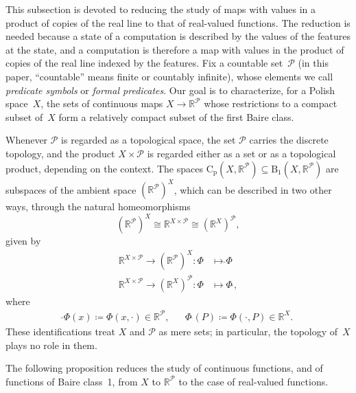 \documentclass[psamsfonts]{amsart}
\theoremstyle{definition}
\theoremstyle{remark}
\newcommand{\Cp}{\mathrm{C}_{\mathrm{p}}}
\numberwithin{equation}{section}
\begin{document}
This subsection is devoted to reducing the study of maps with values in a product of copies of the real line to that of real-valued functions.
The reduction is needed because a state of a computation is described by the values of the features at the state, and a computation is therefore a map with values in the product of copies of the real line indexed by the features.
Fix a countable set~$\mathcal{P}$ (in this paper, “countable” means finite or countably infinite), whose elements we call \emph{predicate symbols} or \emph{formal predicates}.
Our goal is to characterize, for a Polish space~$X$, the sets of continuous maps $X\to\mathbb{R}^{\mathcal{P}}$ whose restrictions to a compact subset of~$X$ form a relatively compact subset of the first Baire class.

Whenever $\mathcal{P}$ is regarded as a topological space, the set $\mathcal{P}$ carries the discrete topology, and the product $X\times \mathcal{P}$ is regarded either as a set or as a topological product, depending on the context.
The spaces $\Cp(X, \mathbb{R}^{\mathcal{P}})\subseteq \mathrm{B}_1(X, \mathbb{R}^{\mathcal{P}})$ are subspaces of the ambient space $(\mathbb{R}^{\mathcal{P}})^X$, which can be described in two other ways, through the natural homeomorphisms
\begin{equation*}
(\mathbb{R}^{\mathcal{P}})^X \cong \mathbb{R}^{X\times \mathcal{P}} \cong (\mathbb{R}^X)^{\mathcal{P}},
\end{equation*}
given by
\begin{align*}
\mathbb{R}^{X\times \mathcal{P}} \to (\mathbb{R}^{\mathcal{P}})^X: \Phi & \mapsto {\hat{}}\Phi    \\
\mathbb{R}^{X\times \mathcal{P}} \to (\mathbb{R}^X)^{\mathcal{P}}: \Phi & \mapsto \Phi{\,\hat{}},
\end{align*}
where
\begin{align*}
\hat{}\Phi(x)\coloneqq \Phi(x, \cdot)\in \mathbb{R}^{\mathcal{P}}, &  &
\Phi\,\hat{}(P)\coloneqq \Phi(\cdot, P) \in \mathbb{R}^X.
\end{align*}
These identifications treat $X$ and $\mathcal{P}$ as mere sets;
in particular, the topology of~$X$ plays no role in them.

The following proposition reduces the study of continuous functions, and of functions of Baire class~1, from $X$ to $\mathbb{R}^{\mathcal{P}}$ to the case of real-valued functions.
\end{document}
